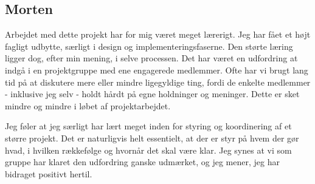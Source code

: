 \subsection{Morten}
Arbejdet med dette projekt har for mig været meget lærerigt. 
Jeg har fået et højt fagligt udbytte, særligt i design og implementeringsfaserne. 
Den størte læring ligger dog, efter min mening, i selve processen. Det har været en udfordring at indgå i en projektgruppe med ene engagerede medlemmer. 
Ofte har vi brugt lang tid på at diskutere mere eller mindre ligegyldige ting, fordi de enkelte medlemmer - inklusive jeg selv - holdt hårdt på egne holdninger og meninger. 
Dette er sket mindre og mindre i løbet af projektarbejdet.

Jeg føler at jeg særligt har lært meget inden for styring og koordinering af et større projekt. 
Det er naturligvis helt essentielt, at der er styr på hvem der gør hvad, i hvilken rækkefølge og hvornår det skal være klar. 
Jeg synes at vi som gruppe har klaret den udfordring ganske udmærket, og jeg mener, jeg har bidraget positivt hertil. 
